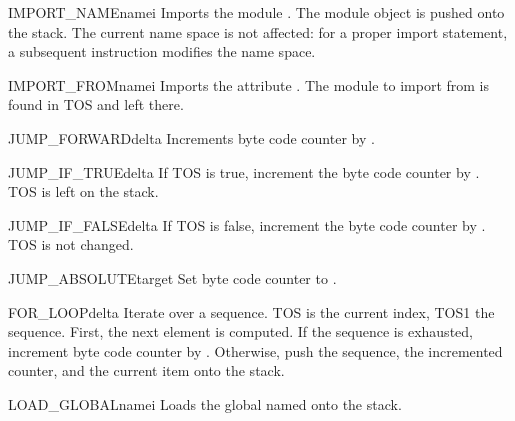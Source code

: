 \begin{opcodedesc}{IMPORT_NAME}{namei}
Imports the module .  The module object is
pushed onto the stack.  The current name space is not affected: for a
proper import statement, a subsequent  instruction
modifies the name space.
\end{opcodedesc}

\begin{opcodedesc}{IMPORT_FROM}{namei}
Imports the attribute .  The module to import
from is found in TOS and left there.
\end{opcodedesc}

\begin{opcodedesc}{JUMP_FORWARD}{delta}
Increments byte code counter by .
\end{opcodedesc}

\begin{opcodedesc}{JUMP_IF_TRUE}{delta}
If TOS is true, increment the byte code counter by .  TOS is
left on the stack.
\end{opcodedesc}

\begin{opcodedesc}{JUMP_IF_FALSE}{delta}
If TOS is false, increment the byte code counter by .  TOS
is not changed. 
\end{opcodedesc}

\begin{opcodedesc}{JUMP_ABSOLUTE}{target}
Set byte code counter to .
\end{opcodedesc}

\begin{opcodedesc}{FOR_LOOP}{delta}
Iterate over a sequence.  TOS is the current index, TOS1 the sequence.
First, the next element is computed.  If the sequence is exhausted,
increment byte code counter by .  Otherwise, push the
sequence, the incremented counter, and the current item onto the stack.
\end{opcodedesc}


\begin{opcodedesc}{LOAD_GLOBAL}{namei}
Loads the global named  onto the stack.
\end{opcodedesc}


